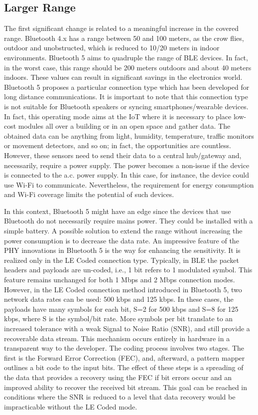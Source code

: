 \documentclass[12pt, draftclsnofoot, onecolumn]{IEEEtran}
\begin{document}
\subsection{Larger Range}
\label{subsec:range}

The first significant change is related to a meaningful increase in the covered range. Bluetooth 4.x has a range between 50 and 100 meters, as the crow flies, outdoor and unobstructed, which is reduced to 10/20 meters in indoor environments. Bluetooth 5 aims to quadruple the range of BLE devices. In fact, in the worst case, this range should be 200 meters outdoors and about 40 meters indoors. These values can result in significant savings in the electronics world. Bluetooth 5 proposes a particular connection type which has been developed for long distance communications. It is important to note that this connection type is not suitable for Bluetooth speakers or syncing smartphones/wearable devices. In fact, this operating mode aims at the IoT where it is necessary to place low-cost modules all over a building or in an open space and gather data. The obtained data can be anything from light, humidity, temperature, traffic monitors or movement detectors, and so on; in fact, the opportunities are countless. However, these sensors need to send their data to a central hub/gateway and, necessarily, require a power supply. The power becomes a non-issue if the device is connected to the a.c. power supply. In this case, for instance, the device could use Wi-Fi to communicate. Nevertheless, the requirement for energy consumption and Wi-Fi coverage limits the potential of such devices.

In this context, Bluetooth 5 might have an edge since the devices that use Bluetooth do not necessarily require mains power. They could be installed with a simple battery. A possible solution to extend the range without increasing the power consumption is to decrease the data rate. An impressive feature of the PHY innovations in Bluetooth 5 is the way for enhancing the sensitivity. It is realized only in the LE Coded connection type. Typically, in BLE the packet headers and payloads are un-coded, i.e., 1 bit refers to 1 modulated symbol. This feature remains unchanged for both 1 Mbps and 2 Mbps connection modes. However, in the LE Coded connection method introduced in Bluetooth 5, two network data rates can be used: 500 kbps and 125 kbps. In these cases, the payloads have many symbols for each bit, S=2 for 500 kbps and S=8 for 125 kbps, where S is the symbol/bit rate. More symbols per bit translate to an increased tolerance with a weak Signal to Noise Ratio (SNR), and still provide a recoverable data stream. This mechanism occurs entirely in hardware in a transparent way to the developer. The coding process involves two stages. The first is the Forward Error Correction (FEC), and, afterward, a pattern mapper outlines a bit code to the input bits. The effect of these steps is a spreading of the data that provides a recovery using the FEC if bit errors occur and an improved ability to recover the received bit stream. This goal can be reached in conditions where the SNR is reduced to a level that data recovery would be impracticable without the LE Coded mode.
\end{document}
